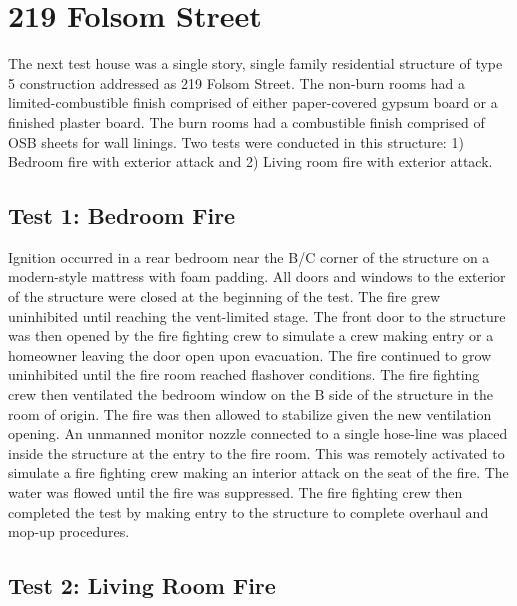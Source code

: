 \documentclass[12pt,oneside]{book}
\begin{document}
\section{219 Folsom Street}

The next test house was a single story, single family residential structure of type 5 construction addressed as 219 Folsom Street. The non-burn rooms had a limited-combustible finish comprised of either paper-covered gypsum board or a finished plaster board. The burn rooms had a combustible finish comprised of OSB sheets for wall linings. Two tests were conducted in this structure: 1) Bedroom fire with exterior attack and 2) Living room fire with exterior attack.

\subsection{Test 1: Bedroom Fire}

Ignition occurred in a rear bedroom near the B/C corner of the structure on a modern-style mattress with foam padding. All doors and windows to the exterior of the structure were closed at the beginning of the test. The fire grew uninhibited until reaching the vent-limited stage. The front door to the structure was then opened by the fire fighting crew to simulate a crew making entry or a homeowner leaving the door open upon evacuation. The fire continued to grow uninhibited until the fire room reached flashover conditions. The fire fighting crew then ventilated the bedroom window on the B side of the structure in the room of origin. The fire was then allowed to stabilize given the new ventilation opening. An unmanned monitor nozzle connected to a single hose-line was placed inside the structure at the entry to the fire room. This was remotely activated to simulate a fire fighting crew making an interior attack on the seat of the fire. The water was flowed until the fire was suppressed. The fire fighting crew then completed the test by making entry to the structure to complete overhaul and mop-up procedures. 

\subsection{Test 2: Living Room Fire}
\end{document}

